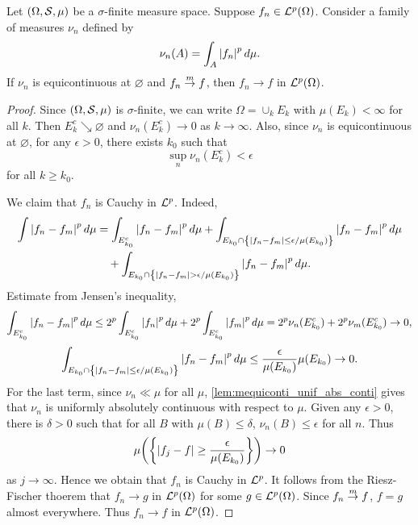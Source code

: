 \begin{theorem}
    Let $(\Omega,\S,\mu)$ be a $\sigma$-finite measure space. Suppose 
    $f_n\in\L^p(\Omega)$. Consider a family of measures 
    $\nu_n$ defined by 
    \begin{equation*}
        \nu_n(A) = \int_A \abs{f_n}^p d\mu.
    \end{equation*}
    If $\nu_n$ is equicontinuous at $\varnothing$ and $f_n\mto f$, then 
    $f_n\to f$ in $\L^p(\Omega)$.
\end{theorem}
\begin{proof}
    Since $(\Omega,\S,\mu)$ is $\sigma$-finite, we can write $\Omega = \cup_k E_k$ 
    with $\mu(E_k)<\infty$ for all $k$. Then $E_k^c\searrow\varnothing$ and 
    $\nu_n(E_k^c)\to 0$ as $k\to\infty$. Also, since $\nu_n$ is equicontinuous at $\varnothing$, 
    for any $\epsilon>0$, there exists $k_0$ such that 
    \begin{equation*}
        \sup_{n}\nu_n(E_k^c) < \epsilon
    \end{equation*}
    for all $k\geq k_0$. 
    
    We claim that $f_n$ is Cauchy in $\L^p$. Indeed, 
    \begin{equation*}
        \begin{split}
            \int \abs{f_n-f_m}^pd\mu &= \int_{E_{k_0}^c} \abs{f_n-f_m}^pd\mu 
            + \int_{E_{k_0}\cap \set{\abs{f_n-f_m}\leq\epsilon/\mu(E_{k_0})}}\abs{f_n-f_m}^pd\mu \\
            &\quad + \int_{E_{k_0}\cap \set{\abs{f_n-f_m}>\epsilon/\mu(E_{k_0})}}\abs{f_n-f_m}^pd\mu.
        \end{split}
    \end{equation*}
    Estimate from Jensen's inequality,
    \begin{equation*}
        \int_{E_{k_0}^c}\abs{f_n-f_m}^pd\mu \leq 2^p\int_{E_{k_0}^c}\abs{f_n}^pd\mu + 2^p\int_{E_{k_0}^c}\abs{f_m}^pd\mu 
        = 2^p\nu_n(E_{k_0}^c) + 2^p\nu_m(E_{k_0}^c) \to 0,
    \end{equation*}
    \begin{equation*}
        \int_{E_{k_0}\cap \set{\abs{f_n-f_m}\leq\epsilon/\mu(E_{k_0})}}\abs{f_n-f_m}^pd\mu 
        \leq \frac{\epsilon}{\mu(E_{k_0})}\mu(E_{k_0}) \to 0.
    \end{equation*}
    For the last term, since $\nu_n\ll\mu$ for all $\mu$, \cref{lem:mequiconti_unif_abs_conti} 
    gives that $\nu_n$ is uniformly absolutely continuous with respect to $\mu$. 
    Given any $\epsilon>0$, there is $\delta>0$ such that for all $B$ with $\mu(B)\leq\delta$, 
    $\nu_n(B)\leq\epsilon$ for all $n$. Thus 
    \begin{equation*}
        \mu\pth{\set{\abs{f_j-f}\geq\frac{\epsilon}{\mu(E_{k_0})}}} \to 0
    \end{equation*}
    as $j\to\infty$. Hence we obtain that $f_n$ is Cauchy in $\L^p$. It follows 
    from the Riesz-Fischer thoerem that $f_n\to g$ in $\L^p(\Omega)$ for some 
    $g\in\L^p(\Omega)$. Since $f_n\mto f$, $f = g$ almost everywhere. 
    Thus $f_n\to f$ in $\L^p(\Omega)$.
\end{proof}